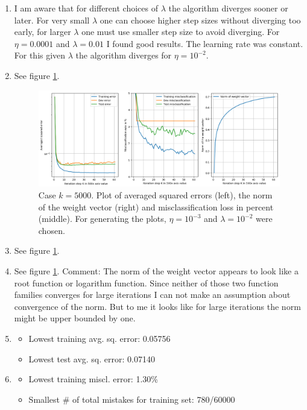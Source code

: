 \documentclass[12pt]{article}
\begin{document}
\begin{enumerate}
	\item I am aware that for different choices of $\lambda$ the algorithm diverges sooner or later. For very small $\lambda$ one can choose higher step sizes without diverging too early, for larger $\lambda$ one must use smaller step size to avoid diverging. For $\eta=0.0001$ and $\lambda=0.01$ I found good results. The learning rate was constant. For this given $\lambda$ the algorithm diverges for $\eta=10^{-2}$.
	\item See figure \ref{fig:5.1}.
	\begin{figure}[b]
		\centering
		\includegraphics[width=\linewidth]{./Problem_5/Problem_5.1.png}
		\caption{Case $k=5000$. Plot of averaged squared errors (left), the norm of the weight vector (right) and misclassification loss in percent (middle). For generating the plots, $\eta = 10^{-3}$ and $\lambda=10^{-2}$ were chosen.}
		\label{fig:5.1}
	\end{figure}
	\item See figure \ref{fig:5.1}.
	\item See figure \ref{fig:5.1}. Comment: The norm of the weight vector appears to look like a root function or logarithm function. Since neither of those two function families converges for large iterations I can not make an assumption about convergence of the norm. But to me it looks like for large iterations the norm might be upper bounded by one.  
	\item 
	\begin{itemize}
		\item Lowest training avg. sq. error: 0.05756
		\item Lowest test avg. sq. error: 0.07140
	\end{itemize}
	\item
	\begin{itemize}
		\item Lowest training miscl. error: 1.30\%
		\item Smallest \# of total mistakes for training set: 780/60000

\end{itemize}
\end{enumerate}
\end{document}
